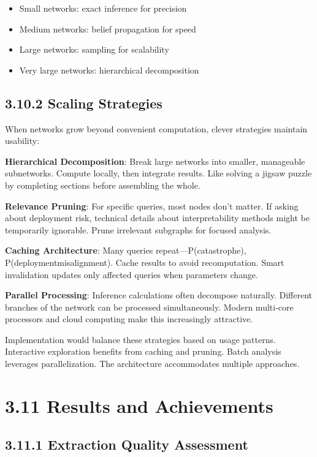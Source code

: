 \documentclass[
  11pt,
  letterpaper,
]{book}
\providecommand{\tightlist}{%
  \setlength{\itemsep}{0pt}\setlength{\parskip}{0pt}}
\begin{document}
\begin{itemize}
\tightlist
\item
  Small networks: exact inference for precision
\item
  Medium networks: belief propagation for speed
\item
  Large networks: sampling for scalability
\item
  Very large networks: hierarchical decomposition
\end{itemize}

\subsection{3.10.2 Scaling Strategies}\label{sec-scaling-strategies}

When networks grow beyond convenient computation, clever strategies
maintain usability:

\textbf{Hierarchical Decomposition}: Break large networks into smaller,
manageable subnetworks. Compute locally, then integrate results. Like
solving a jigsaw puzzle by completing sections before assembling the
whole.

\textbf{Relevance Pruning}: For specific queries, most nodes don't
matter. If asking about deployment risk, technical details about
interpretability methods might be temporarily ignorable. Prune
irrelevant subgraphs for focused analysis.

\textbf{Caching Architecture}: Many queries repeat---P(catastrophe),
P(deployment\textbar misalignment). Cache results to avoid
recomputation. Smart invalidation updates only affected queries when
parameters change.

\textbf{Parallel Processing}: Inference calculations often decompose
naturally. Different branches of the network can be processed
simultaneously. Modern multi-core processors and cloud computing make
this increasingly attractive.

Implementation would balance these strategies based on usage patterns.
Interactive exploration benefits from caching and pruning. Batch
analysis leverages parallelization. The architecture accommodates
multiple approaches.

\section{3.11 Results and Achievements}\label{sec-results-achievements}

\subsection{3.11.1 Extraction Quality
Assessment}\label{sec-extraction-quality}
\end{document}
